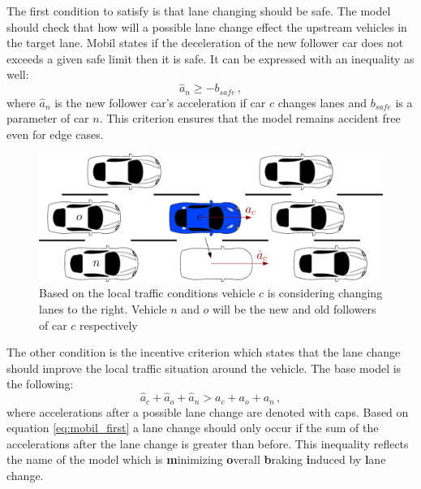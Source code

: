 \documentclass[a4paper,12pt,twoside]{report}
\begin{document}
			The first condition to satisfy is that lane changing should be safe. The model should check that how will a possible lane change effect the upstream vehicles in the target lane. Mobil states if the deceleration of the new follower car does not exceeds a given safe limit then it is safe. It can be expressed with an inequality as well:
			\begin{equation}
				\hat{a}_n\geq -b_{safe}\,,
			\end{equation}
			where $\hat{a}_n$ is the new follower car's acceleration if car $c$ changes lanes and $b_{safe}$ is a parameter of car $n$. This criterion ensures that the model remains accident free even for edge cases.
			\begin{figure}[ht]
				\centering
				\includegraphics[width=\textwidth]{mobil.eps}
				\caption{Based on the local traffic conditions vehicle $c$ is considering changing lanes  to the right. Vehicle $n$ and $o$ will be the new and old followers of car $c$ respectively}
				\label{fig:mobil}
			\end{figure}
			The other condition is the incentive criterion which states that the lane change should improve the local traffic situation around the vehicle.  The base model is the following:
			\begin{equation}
				\hat{a}_c + \hat{a}_o + \hat{a}_n > a_c + a_o + a_n\,,
				\label{eq:mobil_first}
			\end{equation}
			where accelerations after a possible lane change are denoted with caps.
			Based on equation \ref{eq:mobil_first} a lane change should only occur if the sum of the accelerations after the lane change is greater than before. This inequality reflects the name of the model which is \textbf{m}inimizing \textbf{o}verall \textbf{b}raking \textbf{i}nduced by \textbf{l}ane change.
\end{document}

